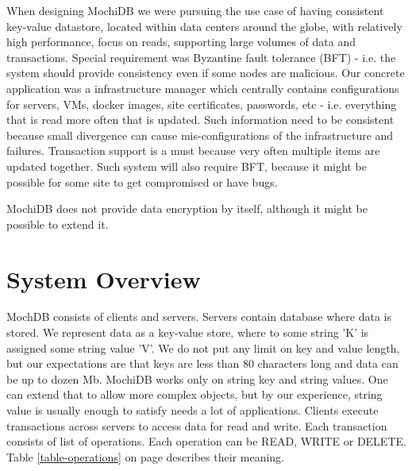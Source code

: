 \documentclass[letterpaper,twocolumn,10pt]{article}
\begin{document}
When designing MochiDB we were pursuing the use case of having consistent key-value datastore, located within data centers around the globe, with relatively high performance, focus on reads, supporting large volumes of data and transactions. Special requirement was Byzantine fault tolerance (BFT) - i.e. the system should provide consistency even if some nodes are malicious. Our concrete application was a infrastructure manager which centrally contains configurations for servers, VMs, docker images, site certificates, passwords, etc - i.e. everything that is read more often that is updated. Such information need to be consistent because small divergence can cause mis-configurations of the infrastructure and failures. Transaction support is a must because very often multiple items are updated together. Such system will also require BFT, because it might be possible for some site to get compromised or have bugs.

MochiDB does not provide data encryption by itself, although it might be possible to extend it.

\section{System Overview}
MochDB consists of clients and servers. Servers contain database where data is stored. We represent data as a key-value store, where to some string 'K' is assigned some string value 'V'. We do not put any limit on key and value length, but our expectations are that keys are less than 80 characters long and data can be up to dozen Mb. MochiDB works only on string key and string values. One can extend that to allow more complex objects, but by our experience, string value is usually enough to satisfy needs a lot of applications.
Clients execute transactions across servers to access data for read and write. Each transaction consists of list of operations. Each operation can be READ, WRITE or DELETE. Table \ref{table-operations} on page \pageref{table-operations} describes their meaning.

\begin{table}[]
\centering
\caption{MochiDB client operations}
\label{table-operations}
\end{table}
\end{document}
